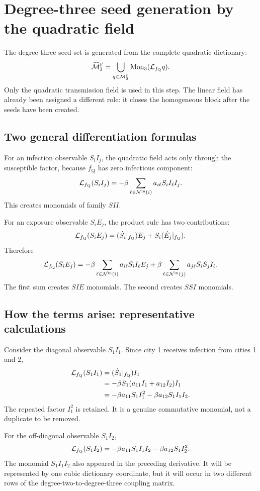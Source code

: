\section{Degree-three seed generation by the quadratic field}
\label{sec:cubic_generation}

The degree-three seed set is generated from the complete quadratic dictionary:
\[
\widehat{\mathcal M}_3^{\mathcal{E}}
=
\bigcup_{q\in\mathcal M_2^{\mathcal{E}}}
\operatorname{Mon}_3(\mathcal{L}_{f_{\mathrm Q}} q).
\]
Only the quadratic transmission field is used in this step. The linear field
has already been assigned a different role: it closes the homogeneous block
after the seeds have been created.

\subsection{Two general differentiation formulas}

For an infection observable $S_iI_j$, the quadratic field acts only through the
susceptible factor, because $f_{\mathrm Q}$ has zero infectious component:
\[
\mathcal{L}_{f_{\mathrm Q}}(S_iI_j)
=
-\beta\sum_{\ell\in\mathcal{N}^{\mathrm{in}}(i)}
 a_{i\ell}S_iI_\ell I_j.
\]
This creates monomials of family $SII$.

For an exposure observable $S_iE_j$, the product rule has two contributions:
\[
\mathcal{L}_{f_{\mathrm Q}}(S_iE_j)
=
(\dot S_i|_{f_{\mathrm Q}})E_j
+
S_i(\dot E_j|_{f_{\mathrm Q}}).
\]
Therefore
\[
\mathcal{L}_{f_{\mathrm Q}}(S_iE_j)
=
-\beta\sum_{\ell\in\mathcal{N}^{\mathrm{in}}(i)}
 a_{i\ell}S_iI_\ell E_j
+
\beta\sum_{\ell\in\mathcal{N}^{\mathrm{in}}(j)}
 a_{j\ell}S_iS_jI_\ell.
\]
The first sum creates $SIE$ monomials. The second creates $SSI$ monomials.

\subsection{How the terms arise: representative calculations}

Consider the diagonal observable $S_1I_1$. Since city 1 receives infection
from cities 1 and 2,
\[
\begin{aligned}
\mathcal{L}_{f_{\mathrm Q}}(S_1I_1)
&=(\dot S_1|_{f_{\mathrm Q}})I_1\\
&=-\beta S_1(a_{11}I_1+a_{12}I_2)I_1\\
&=-\beta a_{11}S_1I_1^2
  -\beta a_{12}S_1I_1I_2.
\end{aligned}
\]
The repeated factor $I_1^2$ is retained. It is a genuine commutative monomial,
not a duplicate to be removed.

For the off-diagonal observable $S_1I_2$,
\[
\mathcal{L}_{f_{\mathrm Q}}(S_1I_2)
=-\beta a_{11}S_1I_1I_2
 -\beta a_{12}S_1I_2^2.
\]
The monomial $S_1I_1I_2$ also appeared in the preceding derivative. It will be
represented by one cubic dictionary coordinate, but it will occur in two
different rows of the degree-two-to-degree-three coupling matrix.

